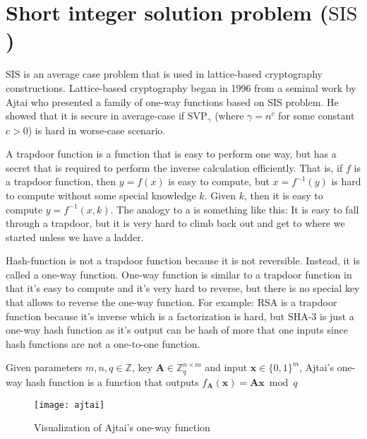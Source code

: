 \section{Short integer solution problem (\texorpdfstring{$\mathrm{SIS}$}{SIS})}
$\mathrm{SIS}$ is an average case problem that is used in lattice-based cryptography constructions. Lattice-based cryptography began in 1996 from a seminal work by Ajtai who presented a family of one-way functions based on SIS problem. He showed that it is secure in average-case if $\mathrm{SVP}_{\gamma }$ (where $\gamma =n^{c}$ for some constant $c > 0$) is hard in worse-case scenario.



A trapdoor function is a function that is easy to perform one way, but has a secret that is required to perform the inverse calculation efficiently. That is, if $f$ is a trapdoor function, then $y=f(x)$ is easy to compute, but $x=f^{-1}(y)$ is hard to compute without some special knowledge $k$. Given $k$, then it is easy to compute $y=f^{-1}(x,k)$. The analogy to a  is something like this: It is easy to fall through a trapdoor, but it is very hard to climb back out and get to where we started unless we have a ladder.

Hash-function is not a trapdoor function because it is not reversible. Instead, it is called a one-way function. One-way function is similar to a trapdoor function in that it's easy to compute and it's very hard to reverse, but there is no special key that allows to reverse the one-way function. For example: RSA is a trapdoor function because it's inverse which is a factorization is hard, but SHA-3 is just a one-way hash function as it's output can be hash of more that one inputs since hash functions are not a one-to-one function.

\begin{definition}
\normalfont
Given parameters $m,n,q \in \mathbb{Z}$, key $\textbf{A} \in \mathbb{Z}^{n\times m}_{q}$ and input $\textbf{x} \in \{0,1\}^m$, Ajtai's one-way hash function is a function that outputs $f_{\textbf{A}}(\textbf{x}) = \textbf{A}\textbf{x} \bmod q$
\end{definition}



\begin{figure}[H]
    \centering
    \texttt{[image: ajtai]}
    \caption{Visualization of Ajtai's one-way function}
\end{figure}




